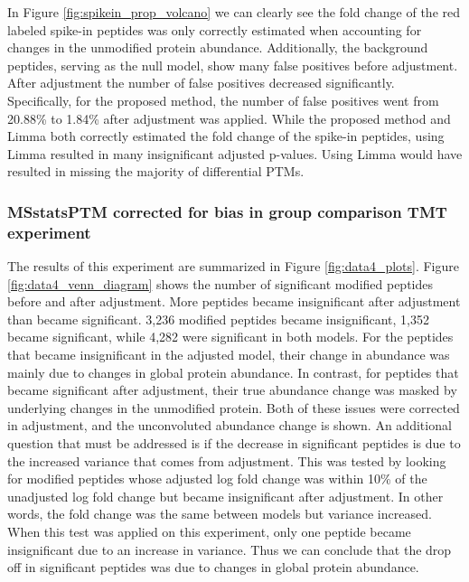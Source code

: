 \documentclass[mcp]{article}
\numberwithin{table}{section}
\begin{document}
In Figure \ref{fig:spikein_prop_volcano} we can clearly see the fold change of the red labeled spike-in peptides was only correctly estimated when accounting for changes in the unmodified protein abundance. Additionally, the background peptides, serving as the null model, show many false positives before adjustment. After adjustment the number of false positives decreased significantly. Specifically, for the proposed method, the number of false positives went from 20.88\% to 1.84\% after adjustment was applied. While the proposed method and Limma both correctly estimated the fold change of the spike-in peptides, using Limma resulted in many insignificant adjusted p-values. Using Limma would have resulted in missing the majority of differential PTMs.

\subsubsection*{MSstatsPTM corrected for bias in group comparison TMT experiment}

The results of this experiment are summarized in Figure \ref{fig:data4_plots}. Figure \ref{fig:data4_venn_diagram} shows the number of significant modified peptides before and after adjustment. More peptides became insignificant after adjustment than became significant. 3,236 modified peptides became insignificant, 1,352 became significant, while 4,282 were significant in both models. For the peptides that became insignificant in the adjusted model, their change in abundance was mainly due to changes in global protein abundance. In contrast, for peptides that became significant after adjustment, their true abundance change was masked by underlying changes in the unmodified protein. Both of these issues were corrected in adjustment, and the unconvoluted abundance change is shown. An additional question that must be addressed is if the decrease in significant peptides is due to the increased variance that comes from adjustment. This was tested by looking for modified peptides whose adjusted log fold change was within 10\% of the unadjusted log fold change but became insignificant after adjustment. In other words, the fold change was the same between models but variance increased. When this test was applied on this experiment, only one peptide became insignificant due to an increase in variance. Thus we can conclude that the drop off in significant peptides was due to changes in global protein abundance.
\end{document}
